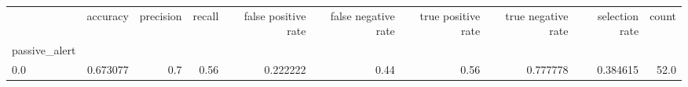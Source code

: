 \begin{tabular}{lrrrrrrrrr}
\toprule
{} &  accuracy &  precision &  recall &  false positive rate &  false negative rate &  true positive rate &  true negative rate &  selection rate &  count \\
passive\_alert &           &            &         &                      &                      &                     &                     &                 &        \\
\midrule
0.0           &  0.673077 &        0.7 &    0.56 &             0.222222 &                 0.44 &                0.56 &            0.777778 &        0.384615 &   52.0 \\
\bottomrule
\end{tabular}
